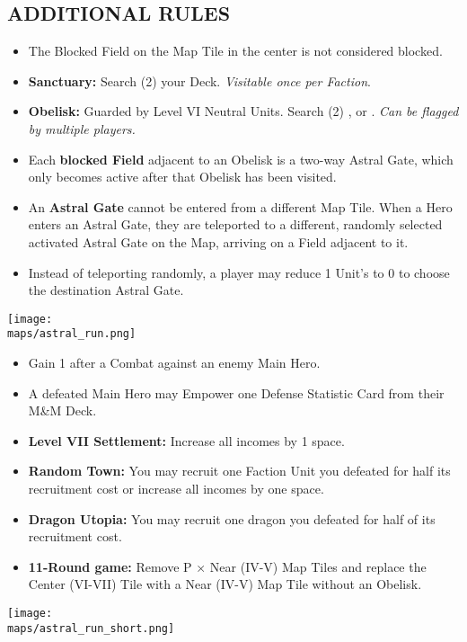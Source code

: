 \begin{multicols*}{2}
\subsection*{\MakeUppercase{Additional Rules}}
\begin{itemize}
  \item The Blocked Field on the Map Tile in the center is not considered blocked.
  \item \textbf{Sanctuary:} Search (2) your Deck. \textit{Visitable once per Faction}.
  \item \textbf{Obelisk:} Guarded by Level VI Neutral Units. Search (2) ,  or . \textit{Can be flagged by multiple players.}
  \item Each \textbf{blocked Field} adjacent to an Obelisk is a two-way Astral Gate, which only becomes active after that Obelisk has been visited.
  \item An \textbf{Astral Gate} cannot be entered from a different Map Tile. When a Hero enters an Astral Gate, they are teleported to a different, randomly selected activated Astral Gate on the Map, arriving on a Field adjacent to it.
  \item Instead of teleporting randomly, a player may reduce 1 Unit's  to 0 to choose the destination Astral Gate.
\end{itemize}

\vspace*{\fill}
\begin{center}
  \texttt{[image: \\maps/astral\_run.png]}
\end{center}

\columnbreak

\begin{itemize}
  \item Gain 1  after a Combat against an enemy Main Hero.
  \item A defeated Main Hero may Empower one Defense Statistic Card from their M\&M Deck.
  \item \textbf{Level VII Settlement:} Increase all incomes by 1 space.
  \item \textbf{Random Town:} You may recruit one Faction Unit you defeated for half its recruitment cost or increase all incomes by one space.
  \item \textbf{Dragon Utopia:} You may recruit one dragon you defeated for half of its recruitment cost.
  \item \textbf{11-Round game:} Remove P × Near (IV-V) Map Tiles and replace the Center (VI-VII) Tile with a Near (IV-V) Map Tile without an Obelisk.
\end{itemize}

\begin{center}
  \hspace*{-2em}\texttt{[image: \\maps/astral\_run\_short.png]}
  \vspace*{-1em}
  \hspace*{2em}
\end{center}
\vspace*{\fill}

\end{multicols*}
